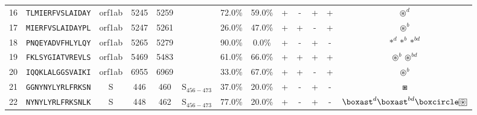 \begin{tabular}{rcccccccccccc}
16 &  \texttt{TLMIERFVSLAIDAY} &  orf1ab &   5245 &  5259 &                &                          72.0\% &                           59.0\% &          + &           - &          + &           + &                                                                      $ \circledast^d $ \\
17 &  \texttt{MIERFVSLAIDAYPL} &  orf1ab &   5247 &  5261 &                &                          26.0\% &                           47.0\% &          + &           + &          - &           + &                                                                      $ \circledast^b $ \\
18 &  \texttt{PNQEYADVFHLYLQY} &  orf1ab &   5265 &  5279 &                &                          90.0\% &                            0.0\% &          + &           - &          + &           - &                                                            $ \ast^d \ast^b \ast^{bd} $ \\
19 &  \texttt{FKLSYGIATVREVLS} &  orf1ab &   5469 &  5483 &                &                          61.0\% &                           66.0\% &          + &           + &          + &           + &                                                     $ \circledast^b \circledast^{bd} $ \\
20 &  \texttt{IQQKLALGGSVAIKI} &  orf1ab &   6955 &  6969 &                &                          33.0\% &                           67.0\% &          + &           + &          - &           + &                                                                      $ \circledast^b $ \\
21 &  \texttt{GGNYNYLYRLFRKSN} &       S &    446 &   460 &  S$_{456-473}$ &                          37.0\% &                           20.0\% &          + &           - &          + &           - &                                                                            $ \boxast $ \\
22 &  \texttt{NYNYLYRLFRKSNLK} &       S &    448 &   462 &  S$_{456-473}$ &                          77.0\% &                           20.0\% &          + &           - &          + &           - &  $ \boxast^d \boxast^{bd} \boxcircle \setlength{\fboxsep}{0.5pt} \boxed{\circledast} $ \\
\bottomrule
\end{tabular}
